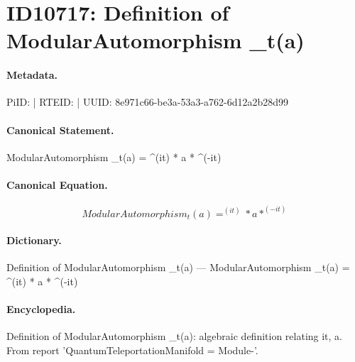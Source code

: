 \section*{ID10717: Definition of ModularAutomorphism \_t(a)}
\paragraph{Metadata.}
PiID:  | RTEID:  | UUID: 8e971c66-be3a-53a3-a762-6d12a2b28d99

\paragraph{Canonical Statement.}
ModularAutomorphism \_t(a) = \textasciicircum{}(it) * a * \textasciicircum{}(-it)

\paragraph{Canonical Equation.}
\[
ModularAutomorphism  _t(a) = ^(it) * a * ^(-it)
\]

\paragraph{Dictionary.}
Definition of ModularAutomorphism \_t(a) — ModularAutomorphism  \_t(a) = \textasciicircum{}(it) * a * \textasciicircum{}(-it)

\paragraph{Encyclopedia.}
Definition of ModularAutomorphism \_t(a): algebraic definition relating it, a. From report 'QuantumTeleportationManifold = Module-'.
